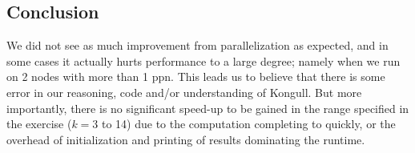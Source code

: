 \documentclass[fontsize=11pt,paper=a4,titlepage]{report}
\begin{document}
\subsection{Conclusion}

We did not see as much improvement from parallelization as expected, and in some
cases it actually hurts performance to a large degree; namely when we run on 2
nodes with more than 1 ppn. This leads us to believe that there is some error in
our reasoning, code and/or understanding of Kongull. But more importantly, there
is no significant speed-up to be gained in the range specified in the exercise
($k=3$ to 14) due to the computation completing to quickly, or the overhead of
initialization and printing of results dominating the runtime.
\end{document}
